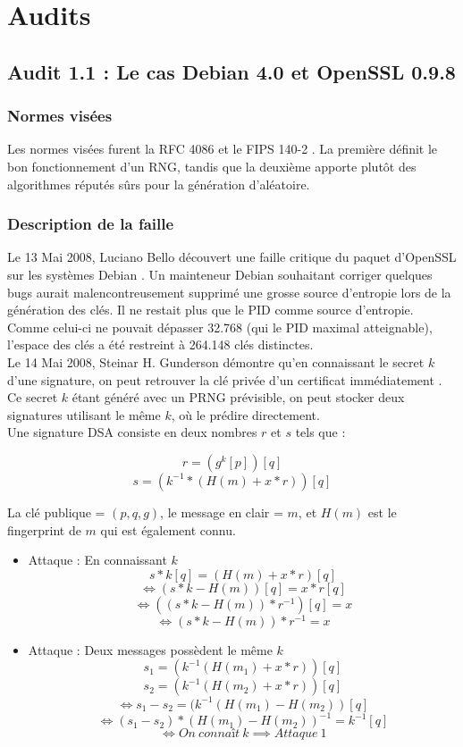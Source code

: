 \section{Audits}
	\subsection{Audit 1.1 : Le cas Debian 4.0 et OpenSSL 0.9.8}
		\subsubsection{Normes visées}
			Les normes visées furent la RFC 4086 \cite{rfc4086}
			et le FIPS 140-2 \cite{fips140-2}.
			La première définit le bon fonctionnement d'un RNG, tandis que 
			la deuxième	apporte plutôt des algorithmes réputés sûrs pour 
			la génération d'aléatoire.
		
		\subsubsection{Description de la faille}
			Le 13 Mai 2008, Luciano Bello découvert une faille critique du 
			paquet d'OpenSSL sur les systèmes Debian
			\cite{faille2008linux.org}. Un mainteneur Debian 	
			souhaitant corriger quelques bugs aurait malencontreusement 	
			supprimé une grosse source d'entropie lors de la génération des 
			clés.	Il ne restait plus que le PID comme source d'entropie.
			Comme celui-ci ne pouvait dépasser 32.768 (qui le PID maximal
			atteignable), l'espace des clés a été restreint à 264.148 clés
			distinctes.\\
		
			Le 14 Mai 2008, Steinar H. Gunderson démontre qu'en connaissant 
			le secret $k$ d'une signature, on peut retrouver
			la clé privée d'un certificat immédiatement \cite{gunderson2008}.		
			Ce secret $k$ étant généré avec un PRNG prévisible, on peut stocker
			deux signatures utilisant le même $k$, où le prédire directement.\\
		
			Une signature DSA consiste en deux nombres $r$ et $s$ tels que :
			
			$$r = (g^k [p]) [q]$$
			$$s = (k^{-1} * (H(m) + x * r)) [q]$$
		
			La clé publique = $(p, q, g)$, le message en clair = $m$, et 
			$H(m)$ est le fingerprint de $m$ qui est également connu.
		
			\begin{itemize}
			\item Attaque  : En connaissant $k$
			$$s * k [q] = (H(m) + x*r) [q]$$
			$$\iff (s * k - H(m)) [q] = x*r [q]$$
			$$\iff ((s*k - H(m))*r^{-1})[q] = x$$
			$$\iff (s*k - H(m))*r^{-1} = x$$
	
			\item Attaque  : Deux messages possèdent le même $k$
			$$s_1 = (k^{-1} (H(m_1) + x*r)) [q]$$
			$$s_2 = (k^{-1} (H(m_2) + x*r)) [q]$$
			$$\iff s_1 - s_2 = (k^{-1} (H(m_1) - H(m_2)) [q]$$
			$$\iff (s_1 - s_2)*(H(m_1) - H(m_2))^{-1} = k^{-1} [q]$$
			$$\iff On\ connaît\ k \implies Attaque\ 1$$\\
			\end{itemize}
	

